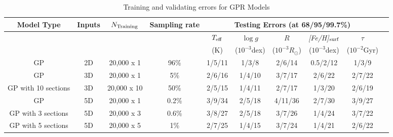 \begin{table}
	\centering
	\caption{Training and validating errors for GPR Models}
	\label{tab:results}
	\begin{tabular}{cccccccccc}
		\hline
		Model Type&Inputs&$N_{\rm Training}$ &Sampling rate &\multicolumn{5}{c}{Testing Errors (at 68/95/99.7\%)} \\
		 \hline
		 \multicolumn{4}{c}{}& $T_{\rm eff}$ &$\log g$  &$R$  &{\it [Fe/H]}$_{\rm surf}$   &$\tau$ \\
		 \multicolumn{4}{c}{}&  (K)& ($10^{-3}$dex) & ($10^{-3}R_{\odot}$)  &  ($10^{-3}$dex)  & ($10^{-2}$Gyr) \\		 
		 \hline
		  GP & 2D & 20,000 x 1 &96\% & 1/5/11 & 1/3/8 & 2/6/14 & 0.5/2/12 &  1/3/9 \\
		 \hline		 
		 GP & 3D & 20,000 x 1 & 5\% & 2/6/16 & 1/4/10 & 3/7/17 &  2/6/22 & 2/7/22 \\
		 GP with 10 sections & 3D & 20,000 x 10 & 50\% & 2/5/15 &1/4/11 & 2/7/17& 1/3/20& 2/6/19\\
		  \hline		 
		GP & 5D & 20,000 x 1 & 0.2\% & 3/9/34 & 2/5/18 & 4/11/36 & 2/7/30 & 3/9/27  \\
		GP with 3 sections & 5D& 20,000 x 3 & 0.6\% &  3/8/27 & 2/5/18 & 3/7/26 & 1/4/24 &3/7/22 \\
		 GP with 5 sections & 5D& 20,000 x 5 & 1\% &  2/7/25 & 1/4/15 & 3/7/24 & 1/4/21 &2/6/22 \\

\end{tabular}
\end{table}
